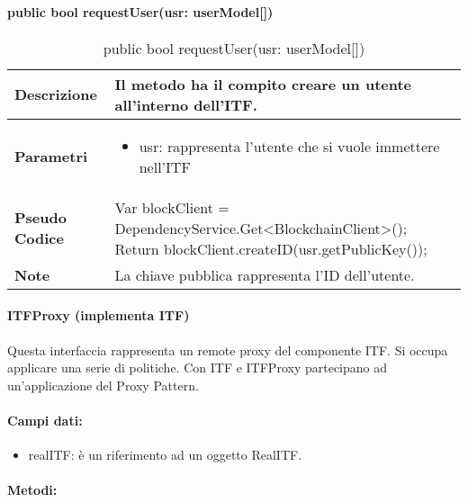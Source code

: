 \paragraph{public bool requestUser(usr: userModel[])}
\begin{center}
    \begin{longtable}{|p{3cm}|p{9cm}|}%
    \caption{public bool requestUser(usr: userModel[])}
    \endfirsthead
    \endhead
    \hline
    \textbf{Descrizione} & Il metodo ha il compito creare un utente all’interno dell’ITF.\\
    \hline
    \textbf{Parametri} &      
    \begin{itemize}
        \item usr: rappresenta l’utente che si vuole immettere nell’ITF
    \end{itemize}
    \\
    \hline
    \textbf{Pseudo Codice} & 
    Var blockClient = DependencyService.Get<BlockchainClient>();\newline
    Return blockClient.createID(usr.getPublicKey());\newline
    \\
    \hline
    \textbf{Note} & 
    La chiave pubblica rappresenta l’ID dell’utente.
    \\
    \hline
    \end{longtable}
    \end{center}

\paragraph{ITFProxy (implementa ITF)}
Questa interfaccia rappresenta un remote proxy del componente ITF. Si occupa applicare una serie di politiche. Con ITF e ITFProxy partecipano ad un’applicazione del Proxy Pattern.
\paragraph{Campi dati:}
\begin{itemize}
    \item realITF: è un riferimento ad un oggetto RealITF. 
\end{itemize}



\paragraph{Metodi:}

